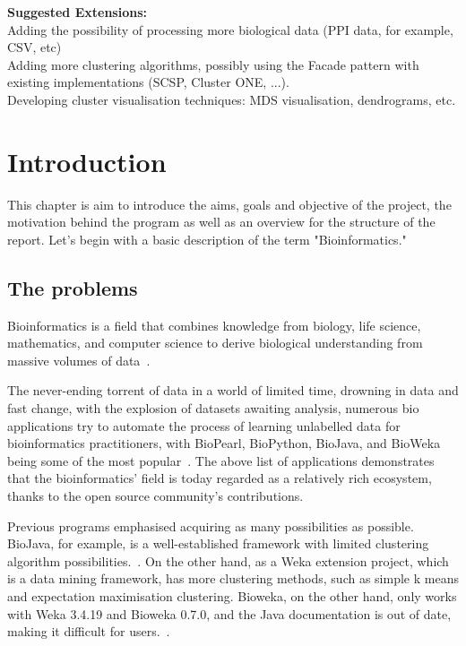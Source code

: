 \documentclass[]{final_report}
\begin{document}
\textbf{Suggested Extensions: }\\
Adding the possibility of processing more biological data (PPI data, for example, CSV, etc)\\
Adding more clustering algorithms, possibly using the Facade pattern with existing implementations (SCSP, Cluster ONE, ...).\\
Developing cluster visualisation techniques: MDS visualisation, dendrograms, etc.\\


\chapter{Introduction}
This chapter is aim to introduce the aims, goals and objective of the project, the motivation behind the program as well as an overview for the structure of the report. Let's begin with a basic description of the term "Bioinformatics."

\section{The problems}
Bioinformatics is a field that combines knowledge from biology, life science, mathematics, and computer science to derive biological understanding from massive volumes of data~\cite{zhang2009machine}.

The never-ending torrent of data in a world of limited time, drowning in data and fast change, with the explosion of datasets awaiting analysis, numerous bio applications try to automate the process of learning unlabelled data for bioinformatics practitioners, with BioPearl, BioPython, BioJava, and BioWeka being some of the most popular~\cite{gewehr2007bioweka}.
The above list of applications demonstrates that the bioinformatics' field is today regarded as a relatively rich ecosystem, thanks to the open source community's contributions.

Previous programs emphasised acquiring as many possibilities as possible. BioJava, for example, is a well-established framework with limited clustering algorithm possibilities.~\cite{lafita2019biojava}. On the other hand, as a Weka extension project, which is a data mining framework, has more clustering methods, such as simple k means and expectation maximisation clustering. Bioweka, on the other hand, only works with Weka 3.4.19 and Bioweka 0.7.0, and the Java documentation is out of date, making it difficult for users.~\cite{gewehr2007bioweka}. 
\end{document}
